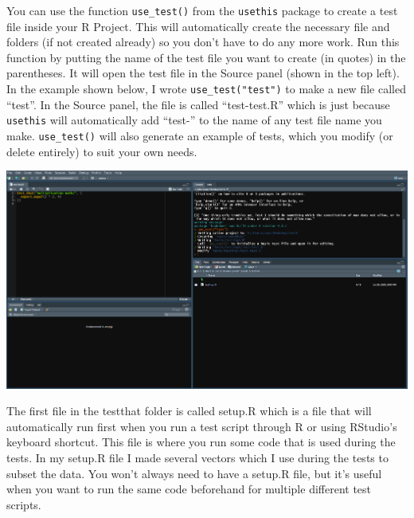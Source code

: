 \documentclass[
  12pt,
  openany]{book}
\begin{document}
You can use the function \texttt{use\_test()} from the \texttt{usethis} package to create a test file inside your R Project. This will automatically create the necessary file and folders (if not created already) so you don't have to do any more work. Run this function by putting the name of the test file you want to create (in quotes) in the parentheses. It will open the test file in the Source panel (shown in the top left). In the example shown below, I wrote \texttt{use\_test("test")} to make a new file called ``test''. In the Source panel, the file is called ``test-test.R'' which is just because \texttt{usethis} will automatically add ``test-'' to the name of any test file name you make. \texttt{use\_test()} will also generate an example of tests, which you modify (or delete entirely) to suit your own needs.

\includegraphics{images/usethis_test.PNG}

The first file in the testthat folder is called setup.R which is a file that will automatically run first when you run a test script through R or using RStudio's keyboard shortcut. This file is where you run some code that is used during the tests. In my setup.R file I made several vectors which I use during the tests to subset the data. You won't always need to have a setup.R file, but it's useful when you want to run the same code beforehand for multiple different test scripts.
\end{document}
